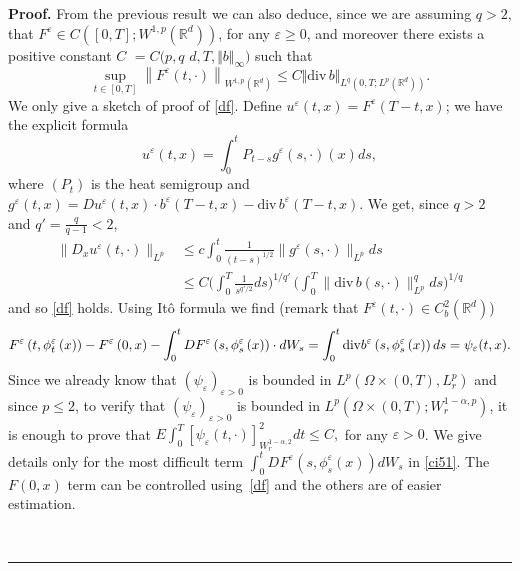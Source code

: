 \documentclass{article}
\newcommand{\eps}{\varepsilon}
\newcommand{\RR}{\mathbb{R}}
\newenvironment{proof}[1][Proof]{\noindent\textbf{#1.} }{\ \rule{0.5em}{0.5em}}
\begin{document}
\begin{proof}
From the previous result we can also deduce, since we are assuming
$q>2$, that  $F^{\eps} \in C( [ 0,T] ;W^{1,p}( \mathbb{R}^{d}) )$,
for any $\eps \ge 0$, and moreover there exists a positive constant
$C$ $=C(p,q$ $
 d,T, \Vert b \Vert _{\infty
})$ such that
\begin{equation} \label{df}
\sup_{t\in\left[ 0,T\right] }\left\|   F^{\eps}(  t,\cdot) \right\|
_{W^{1,p}\left( \mathbb{R}^{d}\right)  } \leq C \Vert
 \mathrm{div \,}b \Vert _{L^{q}(0,T;L^{p}(\mathbb{
R}^{d}))}.
\end{equation}
We only give a  sketch of proof of \eqref{df}.
 Define $u^{\eps} (t,x) = F^{\eps} (T-t, x)$; we
have the explicit formula
$$
 u^{\eps}(t,x) = \int_0^t P_{t-s}g^{\eps}(s, \cdot)(x) ds,
$$
where $(P_t) $ is the heat semigroup and $g^{\eps}(t,x)
 = D u^{\eps} (t,x) \cdot b^{\eps} (T-t,x)
 - {\mathrm{div}\, }b^{\eps} (T-t,x)$. We get, since $q>2$
  and $q' =\frac{q}{q-1}<2$,
\begin{equation*}
\begin{split}
\| D_x u^{\eps}(t, \cdot)\|_{L^p}  & \le  c\int_0^t
 \frac{1}{(t-s)^{1/2}} \| g^{\eps}(s, \cdot)\|_{L^p} ds
\\ & \le C
 \Big( \int_0^T
 \frac{1}{s^{q'/2}}  ds
  \Big)^{1/q'} \, \Big( \int_0^T
   \| \mathrm{div}\,  b (s, \cdot)\|_{L^p}^{q} ds \Big)^{1/q}
\end{split}
\end{equation*}
  and so \eqref{df} holds.
  Using It\^{o} formula we find (remark that
 $F^{\eps}(t, \cdot) \in C^{2}_b(\RR^d)$)
\begin{equation} \label{ci51}
F^{\varepsilon }\left( t,{\phi }_{t}^{\varepsilon }\left( x\right)
\right)
-F^{\varepsilon }\left( 0,x\right) -\int_{0}^{t}DF^{\varepsilon }\left( s,{%
\phi }_{s}^{\varepsilon }\left( x\right) \right) \cdot dW_{s}=
\int_{0}^{t}%
\mathrm{div}b^{\varepsilon }\left( s,{\phi }_{s}^{\varepsilon
}\left( x\right) \right) ds = \psi _{\varepsilon }(t,x ).
\end{equation}
Since we already know that $\left( \psi _{\varepsilon }\right)
_{\varepsilon >0}$ is bounded in $L^{p}(\Omega \times
(0,T),L_{r}^{p})$ and since $p\le 2$, to verify that $\left( \psi
_{\varepsilon }\right) _{\varepsilon >0}$ is bounded in
$L^{p}(\Omega \times (0,T);W_{r}^{1-\alpha,p})$, it is enough to
prove that $ E \int_0^T [\psi _{\varepsilon }(t,
\cdot)]_{W_{r}^{1-\alpha,2}}^2 dt \le C, $ for any $\eps >0$. We
give details only for the most difficult term
$\int_{0}^{t}D^{}F^{\varepsilon }(s,{\phi }
 _{s}^{\eps}(x))  dW_{s}$ in \eqref{ci51}. The $F(0,x)$ term can be controlled using~\eqref{df} and the others are of easier estimation.

\end{proof}
\end{document}
